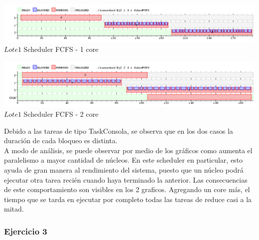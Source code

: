 \vspace*{0.3cm} \vspace*{0.3cm}
  \begin{center}
 \includegraphics[scale=0.5]{./Test/ej2_1.png}
 { $Lote 1$ Scheduler FCFS - 1 core }
 \end{center}
  \vspace*{0.3cm}


\vspace*{0.3cm} \vspace*{0.3cm}
  \begin{center}
 \includegraphics[scale=0.5]{./Test/ej2_2.png}
 { $Lote 1$ Scheduler FCFS - 2 core }
 \end{center}
  \vspace*{0.3cm}


\indent Debido a las tareas de tipo TaskConsola, se observa que en los dos casos la duración 
de cada bloqueo es distinta.\\
\indent A modo de análisis, se puede observar por medio de los gráficos como aumenta el paralelismo a mayor cantidad de núcleos. 
En este scheduler en particular, esto ayuda de gran manera al rendimiento del sistema, puesto que un núcleo podrá ejecutar otra tarea 
recién cuando haya terminado la anterior. Las consecuencias de este comportamiento son visibles en los 2 graficos. Agregando un core más, 
el tiempo que se tarda en ejecutar por completo todas las tareas de reduce casi a la mitad.\\

\subsubsection[Resolución Ejercicio 3]{Ejercicio 3}

